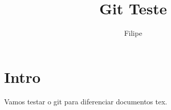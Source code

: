 \documentclass[]{article}
\title{Git Teste}
\author{Filipe}
\begin{document}
\maketitle

\begin{abstract}

\end{abstract}

\section{Intro}
Vamos testar o git para diferenciar documentos tex.
\end{document}
